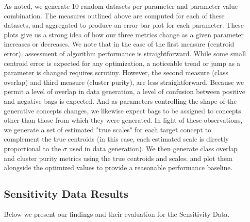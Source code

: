 \documentclass[12pt,dvips]{report}
\numberwithin{equation}{section}
\begin{document}
As noted, we generate 10 random datasets per parameter and parameter value combination.  The measures outlined above are computed for each of these datasets, and aggregated to produce an error-bar plot for each parameter.  These plots give us a strong idea of how our three metrics change as a given parameter increases or decreases. We note that in the case of the first measure (centroid error), assessment of algorithm performance is straightforward.  While some small centroid error is expected for any optimization, a noticeable trend or jump as a parameter is changed requires scrutiny.  However, the second measure (class overlap) and third measure (cluster purity), are less straightforward.  Because we permit a level of overlap in data generation, a level of confusion between positive and negative bags is expected.  And as parameters controlling the shape of the generative concepts changes, we likewise expect bags to be assigned to concepts other than those from which they were generated.  In light of these observations, we generate a set of estimated "true scales" for each target concept to complement the true centroids (in this case, each estimated scale is directly proportional to the $\sigma$ used in data generation).  We then generate class overlap and cluster purity metrics using the true centroids and scales, and plot them alongside the optimized values to provide a reasonable performance baseline.  

\subsection{Sensitivity Data Results} \label{subsec:ParameterSynthResults}

Below we present our findings and their evaluation for the Sensitivity Data.
\end{document}
